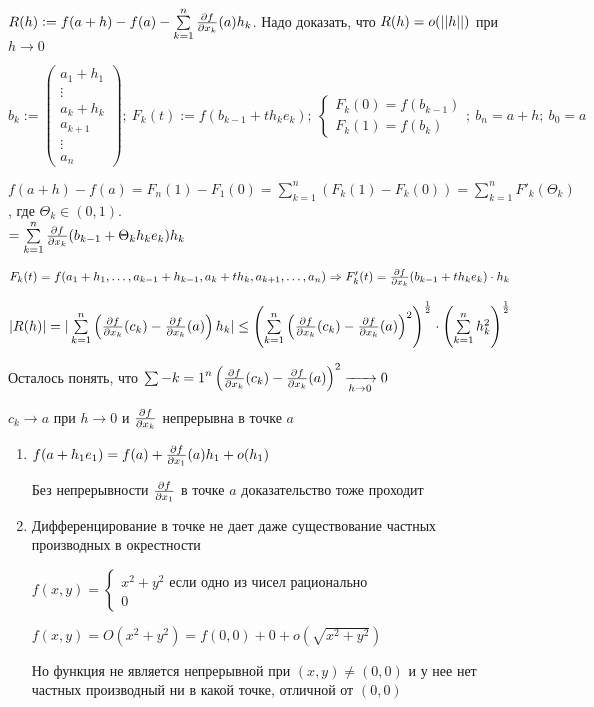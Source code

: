 \documentclass[12pt]{article}
\begin{document}
$R(h) := f(a + h) - f(a) - \sum\limits_{k = 1}^n \frac{\partial f}{\partial x_k}(a)h_k$. Надо доказать, что $R(h) = o(|| h ||)$ при $h \to 0$

$b_k := \begin{pmatrix}
    a_1 + h_1 \\
    \vdots \\
    a_k + h_k \\
    a_{k + 1} \\
    \vdots \\
    a_n
\end{pmatrix};\ F_k(t) := f(b_{k - 1} + th_ke_k);\ \begin{cases}
    F_k(0) = f(b_{k - 1}) \\
    F_k(1) = f(b_k)
\end{cases};\ b_n = a + h;\ b_0 = a$

$f(a + h) - f(a) = F_n(1) - F_1(0) = \sum\limits_{k = 1}^n \left( F_k(1) - F_k(0) \right) = \sum\limits_{k = 1}^n F'_k(\Theta_k)$, где $\Theta_k \in (0, 1)$. \\ $= \sum\limits_{k = 1}^n \frac{\partial f}{\partial x_k}(b_{k - 1} + \Theta_kh_ke_k)h_k$

$F_k(t) = f(a_1 + h_1, \ldots, a_{k - 1} + h_{k - 1}, a_k + th_k, a_{k + 1}, \ldots, a_n) \Rightarrow F_k'(t) = \frac{\partial f}{\partial x_k}(b_{k - 1} + th_ke_k) \cdot h_k$

$|R(h)| = |\sum\limits_{k = 1}^n \left( \frac{\partial f}{\partial x_k}(c_k) - \frac{\partial f}{\partial x_k}(a) \right)h_k| \leq \left( \sum\limits_{k = 1}^n\left( \frac{\partial f}{\partial x_k}(c_k) - \frac{\partial f}{\partial x_k}(a)\right)^2\right)^\frac{1}{2} \cdot \left( \sum\limits_{k = 1}^n h_k^2 \right)^\frac{1}{2}$

Осталось понять, что $\sum\limits-{k = 1}^n \left( \frac{\partial f}{\partial x_k}(c_k) - \frac{\partial f}{\partial x_k}(a)\right)^2 \xrightarrow[h \to 0]{} 0$

$c_k \to a$ при $h \to 0$ и $\frac{\partial f}{\partial x_k}$ непрерывна в точке $a$

\begin{Remark}{}
    \begin{enumerate}
        \item $f(a + h_1e_1) = f(a) + \frac{\partial f}{\partial x_1}(a) h_1 + o(h_1)$ 
        
        Без непрерывности $\frac{\partial f}{\partial x_1}$ в точке $a$ доказательство тоже проходит

        \item Дифференцирование в точке не дает даже существование частных производных в окрестности 
        
        $f(x, y) = \begin{cases}
            x^2 + y^2 \text{ если одно из чисел рационально} \\
            0
        \end{cases}$

        $f(x, y) = O(x^2 + y^2) = f(0, 0) + 0 + o(\sqrt{x^2 + y^2})$

        Но функция не является непрерывной при $(x, y) \neq (0, 0)$ и у нее нет частных производный ни в какой точке, отличной от $(0, 0)$
    \end{enumerate}
\end{Remark}
\end{document}
